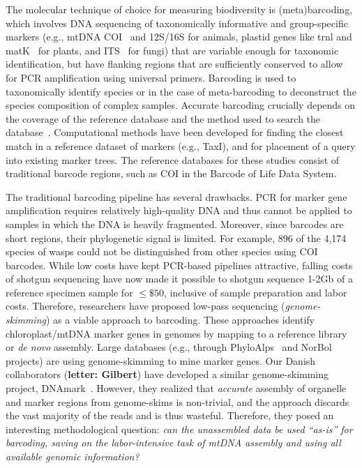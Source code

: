 The molecular technique of choice for measuring biodiversity is
(meta)barcoding\cite{Hebert2003,Savolainen2005,Taberlet2012}, which
involves DNA sequencing of taxonomically informative and
group-specific markers (e.g., mtDNA COI~\cite{Seifert2007,Hebert2003}
and 12S/16S \cite{Vences2005} for animals, plastid genes like trnl and
matK~\cite{Hollingsworth2009} for plants, and ITS~\cite{Schoch2012}
for fungi) that are variable enough for taxonomic identification, but
have flanking regions that are sufficiently conserved to allow for PCR
amplification using universal primers. Barcoding is used to
taxonomically identify species or in the case of meta-barcoding to
deconstruct the species composition of complex samples. Accurate
barcoding crucially depends on the coverage of the reference database
and the method used to search the database~\cite{Taberlet2012}.
Computational methods have been developed for finding the closest
match in a reference dataset of markers (e.g., TaxI\cite{taxl}), and
for placement of a query into existing marker
trees\cite{epa,pplacer}. The reference databases for these studies
consist of traditional barcode regions, such as COI in the Barcode of
Life Data System\cite{BOLD}.

The traditional barcoding pipeline has several drawbacks.  PCR for
marker gene amplification requires relatively high-quality DNA and
thus cannot be applied to samples in which the DNA is heavily
fragmented.  Moreover, since barcodes are short regions, their
phylogenetic signal is limited\cite{Hickerson2006b}.  For example, 896
of the 4,174 species of wasps could not be distinguished from other
species using COI barcodes\cite{Quicke2012}.  While low costs have
kept PCR-based pipelines attractive, falling costs of shotgun
sequencing have now made it possible to shotgun sequence 1-2Gb of a
reference specimen sample for $\le\$50$, inclusive of sample
preparation and labor costs.  Therefore, researchers have proposed
low-pass sequencing (\emph{genome-skimming}) as a viable approach to
barcoding\cite{Coissac2016}. These approaches identify
chloroplast/mtDNA marker genes in genomes by mapping to a reference
library or \emph{de novo} assembly\cite{Liu2013}.  Large databases
(e.g., through PhyloAlps~\cite{PhyloAlps} and NorBol~\cite{NorBol}
projects) are using genome-skimming to mine marker genes.  Our Danish
collaborators ({\bf letter: Gilbert}) have developed a similar
genome-skimming project, DNAmark~\cite{DNAmark}. However, they
realized that {\em accurate} assembly of organelle and marker regions
from genome-skims is non-trivial, and the approach discards the vast
majority of the reads and is thus wasteful.  Therefore, they posed an
interesting methodological question: \emph{can the unassembled data be
  used ``as-is'' for barcoding, saving on the labor-intensive task of
  mtDNA assembly and using all available genomic information?}

